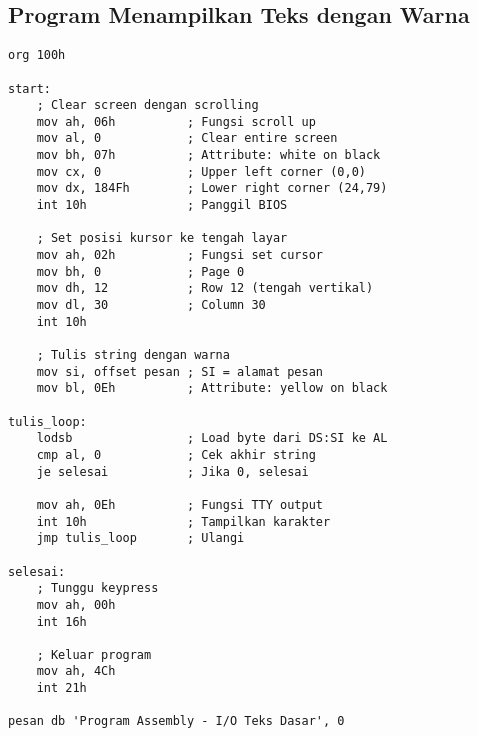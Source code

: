 \documentclass[../main.tex]{subfiles}
\begin{document}
        \subsection{Program Menampilkan Teks dengan Warna}
            \begin{lstlisting}[language={[x86masm]Assembler}, caption=Program Lengkap Output Teks Berwarna, label={lst:colored-text-program}]
org 100h

start:
    ; Clear screen dengan scrolling
    mov ah, 06h          ; Fungsi scroll up
    mov al, 0            ; Clear entire screen
    mov bh, 07h          ; Attribute: white on black
    mov cx, 0            ; Upper left corner (0,0)
    mov dx, 184Fh        ; Lower right corner (24,79)
    int 10h              ; Panggil BIOS
    
    ; Set posisi kursor ke tengah layar
    mov ah, 02h          ; Fungsi set cursor
    mov bh, 0            ; Page 0
    mov dh, 12           ; Row 12 (tengah vertikal)
    mov dl, 30           ; Column 30
    int 10h
    
    ; Tulis string dengan warna
    mov si, offset pesan ; SI = alamat pesan
    mov bl, 0Eh          ; Attribute: yellow on black
    
tulis_loop:
    lodsb                ; Load byte dari DS:SI ke AL
    cmp al, 0            ; Cek akhir string
    je selesai           ; Jika 0, selesai
    
    mov ah, 0Eh          ; Fungsi TTY output
    int 10h              ; Tampilkan karakter
    jmp tulis_loop       ; Ulangi
    
selesai:
    ; Tunggu keypress
    mov ah, 00h
    int 16h
    
    ; Keluar program
    mov ah, 4Ch
    int 21h

pesan db 'Program Assembly - I/O Teks Dasar', 0
            \end{lstlisting}
\end{document}
